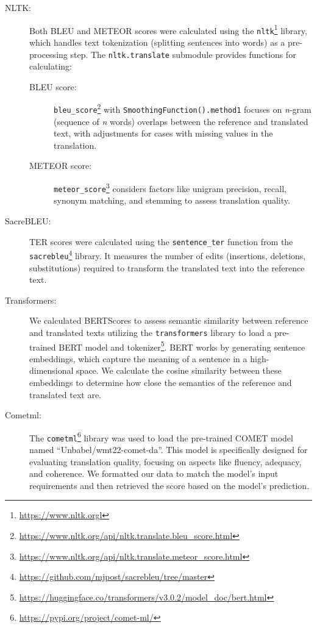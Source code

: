 \begin{description}
    \item[NLTK:] Both BLEU and METEOR scores were calculated using the \texttt{nltk}\footnote{\href{https://www.nltk.org}{https://www.nltk.orgl}} library, which handles text tokenization (splitting sentences into words) as a pre-processing step. The \texttt{nltk.translate} submodule provides functions for calculating:
    \begin{description}
        \item[BLEU score:] \texttt{bleu\_score}\footnote{\href{https://www.nltk.org/api/nltk.translate.bleu_score.html}{https://www.nltk.org/api/nltk.translate.bleu\_score.html}} with \texttt{SmoothingFunction().method1} focuses on \emph{n}-gram (sequence of \emph{n} words) overlaps between the reference and translated text, with adjustments for cases with missing values in the translation.
        \item[METEOR score:] \texttt{meteor\_score}\footnote{\href{https://www.nltk.org/api/nltk.translate.meteor_score.html}{https://www.nltk.org/api/nltk.translate.meteor\_score.html}} considers factors like unigram precision, recall, synonym matching, and stemming to assess translation quality. 
    \end{description}
    \item[SacreBLEU:] TER scores were calculated using the \texttt{sentence\_ter} function from the  \texttt{sacrebleu}\footnote{\href{https://github.com/mjpost/sacrebleu/tree/master}{https://github.com/mjpost/sacrebleu/tree/master}} library. It measures the number of edits (insertions, deletions, substitutions) required to transform the translated text into the reference text.
    \item[Transformers:] We calculated BERTScores to assess semantic similarity between reference and translated texts utilizing the \texttt{transformers} library to load a pre-trained BERT model and tokenizer\footnote{\href{https://huggingface.co/transformers/v3.0.2/model_doc/bert.html}{https://huggingface.co/transformers/v3.0.2/model\_doc/bert.html}}. BERT works by generating sentence embeddings, which capture the meaning of a sentence in a high-dimensional space. We calculate the cosine similarity between these embeddings to determine how close the semantics of the reference and translated text are.
    \item[Cometml:] The \texttt{cometml}\footnote{\href{https://pypi.org/project/comet-ml/}{https://pypi.org/project/comet-ml/}} library was used to load the pre-trained COMET model named ``Unbabel/wmt22-comet-da''. This model is specifically designed for evaluating translation quality, focusing on aspects like fluency, adequacy, and coherence. We formatted our data to match the model's input requirements and then retrieved the score based on the model's prediction.
\end{description}


